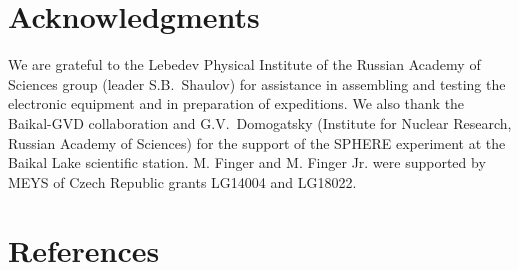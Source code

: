 \documentclass[preprint,5p,times]{elsarticle}
\begin{document}
  
\section{Acknowledgments}

We are grateful to the Lebedev Physical Institute of the Russian Academy of Sciences group (leader S.B.~Shaulov) for assistance in assembling and testing the electronic equipment and in preparation of expeditions. We also thank the Baikal-GVD collaboration and G.V.~Domogatsky (Institute for Nuclear Research, Russian Academy of Sciences) for the support of the SPHERE experiment at the Baikal Lake scientific station.
M. Finger and M. Finger Jr. were supported by MEYS of Czech Republic grants LG14004 and LG18022.

\section{References}


\end{document}
